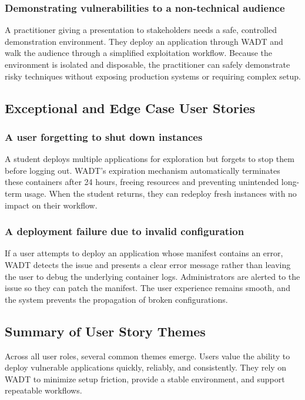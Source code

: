 \documentclass[12pt,titlepage]{article}
\begin{document}
\subsubsection*{Demonstrating vulnerabilities to a non-technical audience}
A practitioner giving a presentation to stakeholders needs a safe, controlled demonstration environment. They deploy an application through WADT and walk the audience through a simplified exploitation workflow. Because the environment is isolated and disposable, the practitioner can safely demonstrate risky techniques without exposing production systems or requiring complex setup.

\subsection{Exceptional and Edge Case User Stories}

\subsubsection*{A user forgetting to shut down instances}
A student deploys multiple applications for exploration but forgets to stop them before logging out. WADT’s expiration mechanism automatically terminates these containers after 24 hours, freeing resources and preventing unintended long-term usage. When the student returns, they can redeploy fresh instances with no impact on their workflow.

\subsubsection*{A deployment failure due to invalid configuration}
If a user attempts to deploy an application whose manifest contains an error, WADT detects the issue and presents a clear error message rather than leaving the user to debug the underlying container logs. Administrators are alerted to the issue so they can patch the manifest. The user experience remains smooth, and the system prevents the propagation of broken configurations.

\subsection{Summary of User Story Themes}

Across all user roles, several common themes emerge. Users value the ability to deploy vulnerable applications quickly, reliably, and consistently. They rely on WADT to minimize setup friction, provide a stable environment, and support repeatable workflows.
\end{document}
